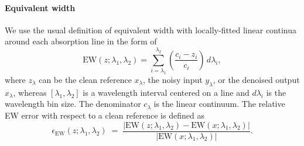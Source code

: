 \documentclass[twocolumn]{aastex7}
\begin{document}
\paragraph{Equivalent width}
%
We use the usual definition of equivalent width with locally-fitted linear continua around each absorption line in the form of
\begin{equation}
    \mathrm{EW}(z;\lambda_{1},\lambda_{2})
    =
    \sum_{i = \lambda_{1}}^{\lambda_{2}}
    \left(
        \frac{c_i - z_i}{c_{i}}
    \right)\,d\lambda_i,
    \label{eq:equivalent_width}
\end{equation}
where $z_\lambda$ can be the clean reference $x_\lambda$, the noisy input $y_\lambda$, or the denoised output $\hat{x}_\lambda$, whereas $[\lambda_{1},\lambda_{2}]$ is a wavelength interval centered on a line and $d\lambda_i$ is the wavelength bin size. The denominator $c_\lambda$ is the linear continuum.
%
%
The relative EW error with respect to a clean reference is defined as
\begin{equation}
    \epsilon_{\mathrm{EW}}(z;\lambda_{1},\lambda_{2})
    \;=\;
    \frac{\left| \mathrm{EW}(z;\lambda_{1},\lambda_{2})-\mathrm{EW}(x;\lambda_{1},\lambda_{2}) \right|}
         {\left| \mathrm{EW}(x;\lambda_{1},\lambda_{2}) \right|}.
    \label{eq:ew_relative_error}
\end{equation}
\end{document}
